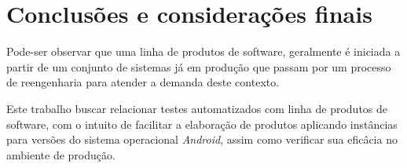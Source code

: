 \documentclass[12pt,a4paper]{article}
\begin{document}
\section{Conclusões e considerações finais}
Pode-ser observar que uma linha de produtos de software, geralmente é iniciada a partir de um conjunto de sistemas já em produção que passam por um processo de reengenharia para atender a demanda deste contexto.

Este trabalho buscar relacionar testes automatizados com linha de produtos de software, com o intuito de facilitar a elaboração de produtos aplicando instâncias para versões do sistema operacional \textit{Android}, assim como verificar sua eficâcia no ambiente de produção.


\newpage


\end{document}
